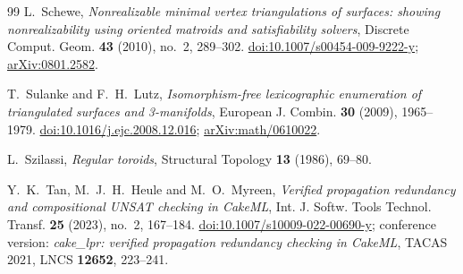 \documentclass[11pt,reqno]{amsart}
\theoremstyle{plain}
\theoremstyle{definition}
\begin{document}
\begin{thebibliography}{99}
L.~Schewe,
\emph{Nonrealizable minimal vertex triangulations of surfaces: showing nonrealizability using oriented
matroids and satisfiability solvers},
Discrete Comput. Geom. \textbf{43} (2010), no.~2, 289--302.
\href{https://doi.org/10.1007/s00454-009-9222-y}{doi:10.1007/s00454-009-9222-y};
\href{https://arxiv.org/abs/0801.2582}{arXiv:0801.2582}.

T.~Sulanke and F.~H.~Lutz,
\emph{Isomorphism-free lexicographic enumeration of triangulated surfaces and 3-manifolds},
European J. Combin. \textbf{30} (2009), 1965--1979.
\href{https://doi.org/10.1016/j.ejc.2008.12.016}{doi:10.1016/j.ejc.2008.12.016};
\href{https://arxiv.org/abs/math/0610022}{arXiv:math/0610022}.

L.~Szilassi, \emph{Regular toroids}, Structural Topology \textbf{13} (1986), 69--80.

Y.~K.~Tan, M.~J.~H.~Heule and M.~O.~Myreen,
\emph{Verified propagation redundancy and compositional UNSAT checking in CakeML},
Int. J. Softw. Tools Technol. Transf. \textbf{25} (2023), no.~2, 167--184.
\href{https://doi.org/10.1007/s10009-022-00690-y}{doi:10.1007/s10009-022-00690-y};
conference version: \emph{cake\_lpr: verified propagation redundancy checking in CakeML},
TACAS 2021, LNCS \textbf{12652}, 223--241.

\end{thebibliography}
\end{document}
